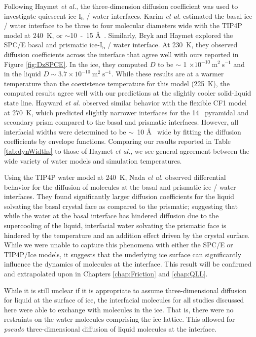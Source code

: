 Following Haymet \textit{et al.}, the three-dimension diffusion
coefficient was used to investigate quiescent ice-I$_\mathrm{h}$ /
water
interfaces. \cite{Karim1987,Karim1988,Hayward2001,Bryk2002,Hayward2002}
Karim \textit{et al.} estimated the basal ice / water interface to be
three to four molecular diameters wide with the TIP4P model at 240~K,
or $\sim$10~-~15 \AA~. Similarly, Bryk and Haymet explored the SPC/E
basal and prismatic ice-I$_\mathrm{h}$ / water interface. At 230~K,
they observed diffusion coefficients across the interface that agree
well with ours reported in Figure \ref{fig:DzSPCE}. In the ice, they
computed $D$ to be $\sim$ 1
$\times 10^{-10}~\mathrm{m}^{2}~\mathrm{s}^{-1}$ and in the liquid
$D \sim 3.7 \times 10^{-10}~\mathrm{m}^{2}~\mathrm{s}^{-1}$. While
these results are at a warmer temperature than the coexistence
temperature for this model (225~K), the computed results agree well
with our predictions at the slightly cooler solid-liquid state
line. Hayward \textit{et al.} observed similar behavior with the
flexible CF1 model at 270~K, which predicted slightly narrower
interfaces for the 14\degree~ pyramidal and secondary prism compared
to the basal and prismatic interfaces. However, all interfacial widths
were determined to be $\sim$~10 \AA~ wide by fitting the diffusion
coefficients by envelope functions. Comparing our results reported in
Table \ref{tab:dynWidths} to those of Haymet \textit{et al.}, we see
general agreement between the wide variety of water models and
simulation temperatures. 

Using the TIP4P water model at 240~K, Nada \textit{et al.}  observed
differential behavior for the diffusion of molecules at the basal and
prismatic ice / water interfaces.\cite{Nada1995} They found
significantly larger diffusion coefficients for the liquid solvating
the basal crystal face as compared to the prismatic; suggesting that
while the water at the basal interface has hindered diffusion due to
the supercooling of the liquid, interfacial water solvating the
prismatic face is hindered by the temperature and an addition effect
driven by the crystal surface. While we were unable to capture this
phenomena with either the SPC/E or TIP4P/Ice models, it suggests that
the underlying ice surface can significantly influence the dynamics of
molecules at the interface. This result will be confirmed and
extrapolated upon in Chapters \ref{chap:Friction} and \ref{chap:QLL}.  

While it is still unclear if it is appropriate to assume
three-dimensional diffusion for liquid at the surface of ice, the
interfacial molecules for all studies discussed here were able to
exchange with molecules in the ice. That is, there were no restraints
on the water molecules comprising the ice lattice. This allowed for
\textit{pseudo} three-dimensional diffusion of liquid molecules at the
interface. 

